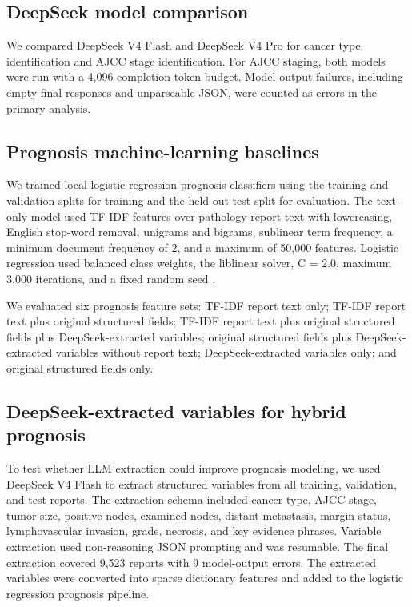 \documentclass[pdflatex,sn-vancouver-num]{sn-jnl}
\begin{document}
\subsection{DeepSeek model comparison}\label{subsec:modelcomparison}

We compared DeepSeek V4 Flash and DeepSeek V4 Pro for cancer type identification and AJCC stage identification. For AJCC staging, both models were run with a 4,096 completion-token budget. Model output failures, including empty final responses and unparseable JSON, were counted as errors in the primary analysis.

\subsection{Prognosis machine-learning baselines}\label{subsec:ml}

We trained local logistic regression prognosis classifiers using the training and validation splits for training and the held-out test split for evaluation. The text-only model used TF-IDF features over pathology report text with lowercasing, English stop-word removal, unigrams and bigrams, sublinear term frequency, a minimum document frequency of 2, and a maximum of 50,000 features. Logistic regression used balanced class weights, the liblinear solver, C = 2.0, maximum 3,000 iterations, and a fixed random seed \cite{pedregosa2011scikit}.

We evaluated six prognosis feature sets: TF-IDF report text only; TF-IDF report text plus original structured fields; TF-IDF report text plus original structured fields plus DeepSeek-extracted variables; original structured fields plus DeepSeek-extracted variables without report text; DeepSeek-extracted variables only; and original structured fields only.

\subsection{DeepSeek-extracted variables for hybrid prognosis}\label{subsec:extraction}

To test whether LLM extraction could improve prognosis modeling, we used DeepSeek V4 Flash to extract structured variables from all training, validation, and test reports. The extraction schema included cancer type, AJCC stage, tumor size, positive nodes, examined nodes, distant metastasis, margin status, lymphovascular invasion, grade, necrosis, and key evidence phrases. Variable extraction used non-reasoning JSON prompting and was resumable. The final extraction covered 9,523 reports with 9 model-output errors. The extracted variables were converted into sparse dictionary features and added to the logistic regression prognosis pipeline.
\end{document}
